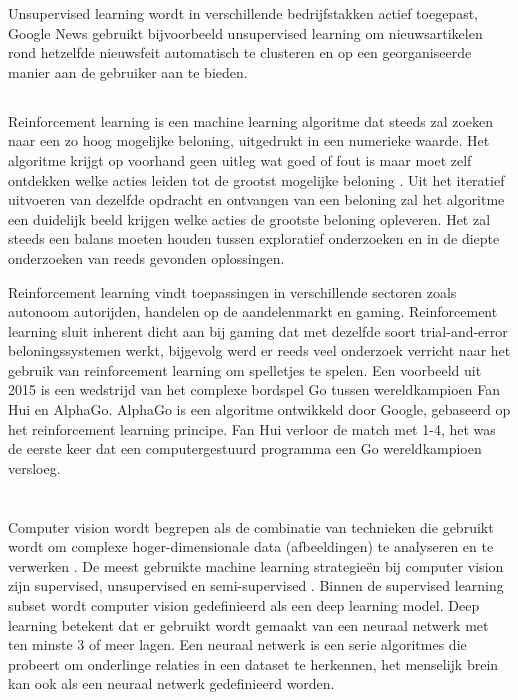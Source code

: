 Unsupervised learning wordt in verschillende bedrijfstakken actief toegepast, Google News gebruikt bijvoorbeeld unsupervised learning om nieuwsartikelen rond hetzelfde nieuwsfeit automatisch te clusteren en op een georganiseerde manier aan de gebruiker aan te bieden.

\subsection{}
\label{sec:reinforcement-learning}
Reinforcement learning is een machine learning algoritme dat steeds zal zoeken naar een zo hoog mogelijke beloning, uitgedrukt in een numerieke waarde. Het algoritme krijgt op voorhand geen uitleg wat goed of fout is maar moet zelf ontdekken welke acties leiden tot de grootst mogelijke beloning \autocite{Sutton2018}. Uit het iteratief uitvoeren van dezelfde opdracht en ontvangen van een beloning zal het algoritme een duidelijk beeld krijgen welke acties de grootste beloning opleveren. Het zal steeds een balans moeten houden tussen exploratief onderzoeken en in de diepte onderzoeken van reeds gevonden oplossingen. 

Reinforcement learning vindt toepassingen in verschillende sectoren zoals autonoom autorijden, handelen op de aandelenmarkt en gaming. Reinforcement learning sluit inherent dicht aan bij gaming dat met dezelfde soort trial-and-error beloningssystemen werkt, bijgevolg werd er reeds veel onderzoek verricht naar het gebruik van reinforcement learning om spelletjes te spelen. Een voorbeeld uit 2015 is een wedstrijd van het complexe bordspel Go tussen wereldkampioen Fan Hui en AlphaGo. AlphaGo is een algoritme ontwikkeld door Google, gebaseerd op het reinforcement learning principe. Fan Hui verloor de match met 1-4, het was de eerste keer dat een computergestuurd programma een Go wereldkampioen versloeg.

\section{}
\label{sec:computer-vision}
Computer vision wordt begrepen als de combinatie van technieken die gebruikt wordt om complexe hoger-dimensionale data (afbeeldingen) te analyseren en te verwerken \autocite{Jaehne2000}. De meest gebruikte machine learning strategieën bij computer vision zijn supervised, unsupervised en semi-supervised \autocite{Khan2020}. Binnen de supervised learning subset wordt computer vision gedefinieerd als een deep learning model. Deep learning betekent dat er gebruikt wordt gemaakt van een neuraal netwerk met ten minste 3 of meer lagen. Een neuraal netwerk is een serie algoritmes die probeert om onderlinge relaties in een dataset te herkennen, het menselijk brein kan ook als een neuraal netwerk gedefinieerd worden.

